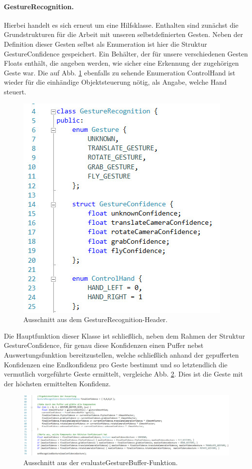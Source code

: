 	\paragraph{GestureRecognition.} Hierbei handelt es sich erneut um eine Hilfsklasse. Enthalten sind zunächst die Grundstrukturen für die Arbeit mit unseren selbstdefinierten Gesten. Neben der Definition dieser Gesten selbst als Enumeration ist hier die Struktur \glqq GestureConfidence\grqq{} gespeichert. Ein Behälter, der für unsere verschiedenen Gesten Floats enthält, die angeben werden, wie sicher eine Erkennung der zugehörigen Geste war. Die auf Abb. \ref{fig:gestrechead} ebenfalls zu sehende Enumeration ControlHand ist wieder für die einhändige Objektsteuerung nötig, als Angabe, welche Hand steuert.\par
	\begin{figure}[h]
	\centering
	\includegraphics[scale=.4]{pictures/gesturerec.jpg}
	\caption{Ausschnitt aus dem GestureRecognition-Header.}\label{fig:gestrechead}
	\end{figure}	
	Die Hauptfunktion dieser Klasse ist schließlich, neben dem Rahmen der Struktur GestureConfidence, für genau diese Konfidenzen einen Puffer nebst Auswertungsfunktion bereitzustellen, welche schließlich anhand der gepufferten Konfidenzen eine Endkonfidenz pro Geste bestimmt und so letztendlich die vermutlich vorgeführte Geste ermittelt, vergleiche Abb. \ref{fig:evalgestbuf}. Dies ist die Geste mit der höchsten ermittelten Konfidenz.
	\begin{figure}
	\centering
	\includegraphics[width=\textwidth]{pictures/gestureeval.jpg}
	\caption{Ausschnitt aus der evaluateGestureBuffer-Funktion.}\label{fig:evalgestbuf}
	\end{figure}

